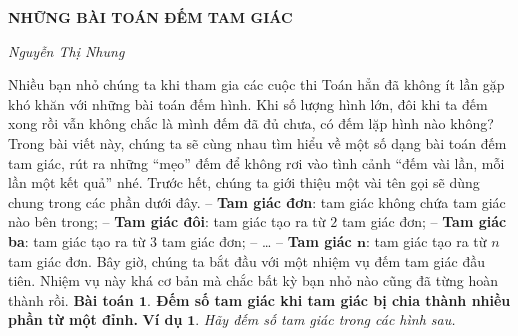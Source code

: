 \newpage
{}
\graphicspath{{../timhieucungbi/demtamgiac1/}}
	\begin{center}
		\textbf{\Large\color{toancuabi}NHỮNG BÀI TOÁN ĐẾM TAM GIÁC}
		
		\vspace*{5pt}
		\textit{Nguyễn Thị Nhung}
	\end{center}

	Nhiều bạn nhỏ chúng ta khi tham gia các cuộc thi Toán hẳn đã không ít lần gặp khó khăn với những bài toán đếm hình. Khi số lượng hình lớn, đôi khi ta đếm xong rồi vẫn không chắc là mình đếm đã đủ chưa, có đếm lặp hình nào không? Trong bài viết này, chúng ta sẽ cùng nhau tìm hiểu về một số dạng bài toán đếm tam giác, rút ra những “mẹo” đếm để không rơi vào tình cảnh “đếm vài lần, mỗi lần một kết quả” nhé.
	\vskip 0.1cm
	Trước hết, chúng ta giới thiệu một vài tên gọi sẽ dùng chung trong các phần dưới đây.
	\vskip 0.1cm
	-- \textbf{\color{toancuabi}Tam giác đơn}: tam giác không chứa tam giác nào bên trong;
	\vskip 0.1cm
	-- \textbf{\color{toancuabi}Tam giác đôi}: tam giác tạo ra từ $2$ tam giác đơn;
	\vskip 0.1cm
	-- \textbf{\color{toancuabi}Tam giác ba}: tam giác tạo ra  từ $3$ tam giác đơn;
	\vskip 0.1cm
	-- \ldots
	\vskip 0.1cm
	-- \textbf{\color{toancuabi}Tam giác $\pmb{n}$}: tam giác tạo ra từ $n$ tam giác đơn.
	\vskip 0.1cm
	Bây giờ, chúng ta bắt đầu với một nhiệm vụ đếm tam giác đầu tiên. Nhiệm vụ này khá cơ bản mà chắc bất kỳ bạn nhỏ nào cũng đã từng hoàn thành rồi.
	\vskip 0.1cm
	\textbf{\color{toancuabi}Bài toán $\pmb{1.}$ Đếm số tam giác khi tam giác bị chia thành nhiều phần từ một đỉnh.}
	\vskip 0.1cm
	\textbf{\color{toancuabi}Ví dụ} $\pmb{1.}$ \textit{Hãy đếm số tam giác trong các hình sau.}
